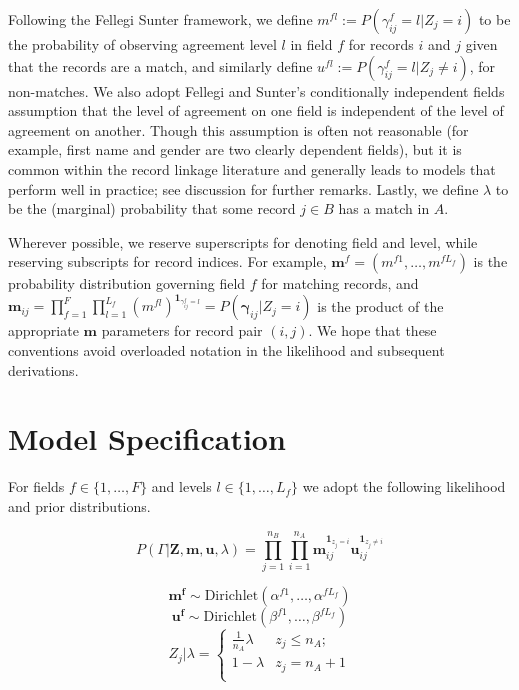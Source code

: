 \documentclass[
  12pt,
]{article}
\begin{document}
Following the Fellegi Sunter framework, we define
\(m^{fl}:= P(\gamma_{ij}^f = l |Z_j = i)\) to be the probability of
observing agreement level \(l\) in field \(f\) for records \(i\) and
\(j\) given that the records are a match, and similarly define
\(u^{fl}:= P(\gamma_{ij}^f = l |Z_j \neq i)\), for non-matches. We also
adopt Fellegi and Sunter's conditionally independent fields assumption
that the level of agreement on one field is independent of the level of
agreement on another. Though this assumption is often not reasonable
(for example, first name and gender are two clearly dependent fields),
but it is common within the record linkage literature and generally
leads to models that perform well in practice; see discussion for
further remarks. Lastly, we define \(\lambda\) to be the (marginal)
probability that some record \(j \in B\) has a match in \(A\).

Wherever possible, we reserve superscripts for denoting field and level,
while reserving subscripts for record indices. For example,
\(\mathbf{m}^f = (m^{f1}, \ldots, m^{fL_f})\) is the probability
distribution governing field \(f\) for matching records, and
\(\mathbf{m}_{ij}= \prod_{f=1}^{F}\prod_{l=1}^{L_f} \left(m^{fl}\right)^{\mathbf{1}_{\gamma_{ij}^f = l}} = P(\boldsymbol{\gamma}_{ij}|Z_j = i)\)
is the product of the appropriate \(\mathbf{m}\) parameters for record
pair \((i,j)\). We hope that these conventions avoid overloaded notation
in the likelihood and subsequent derivations.

\hypertarget{model-specification}{%
\section{Model Specification}\label{model-specification}}

For fields \(f \in \{1, \ldots, F\}\) and levels
\(l\in \{1, \ldots, L_f\}\) we adopt the following likelihood and prior
distributions.

\[P(\Gamma|\mathbf{Z}, \mathbf{m}, \mathbf{u}, \lambda) =\prod_{j=1}^{n_B}  \prod_{i=1}^{n_A}\mathbf{m}_{ij}^{\mathbf{1}_{z_j = i}}\mathbf{u}_{ij}^{\mathbf{1}_{z_j \neq i}}\]

\[\mathbf{m^{f}} \sim \text{Dirichlet}(\alpha^{f1}, \ldots, \alpha^{fL_f})\]
\[\mathbf{u^{f}} \sim \text{Dirichlet}(\beta^{f1}, \ldots, \beta^{fL_f})\]
\[Z_j | \lambda =
\begin{cases} 
    \frac{1}{n_A}\lambda  & z_j \leq n_A; \\
     1-\lambda &  z_j  = n_A + 1 \\
\end{cases}\]
\end{document}
